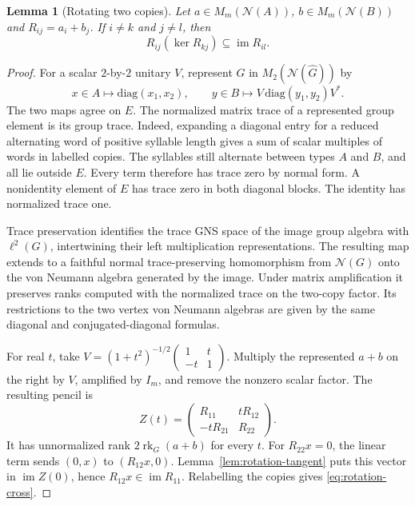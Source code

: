 \documentclass[11pt,a4paper,reqno]{amsart}
\numberwithin{equation}{section}
\newtheorem{lemma}[theorem]{Lemma}
\theoremstyle{remark}
\newcommand{\N}{\mathcal N}
\newcommand{\rk}{\operatorname{rk}}
\newcommand{\im}{\operatorname{im}}
\begin{document}
\begin{lemma}[Rotating two copies]\label{lem:rotation-cross}
Let \(a\in M_m(\N(A))\), \(b\in M_m(\N(B))\) and \(R_{ij}=a_i+b_j\). If \(i\ne k\) and \(j\ne l\), then
\begin{equation}\label{eq:rotation-cross}
                 R_{ij}(\ker R_{kj})\subseteq\im R_{il}.
\end{equation}
\end{lemma}
\begin{proof}
For a scalar \(2\)-by-\(2\) unitary \(V\), represent \(G\) in \(M_2(\N(\widehat G))\) by
\[
 x\in A\longmapsto \mathrm{diag}(x_1,x_2),\qquad
 y\in B\longmapsto V\,\mathrm{diag}(y_1,y_2)V^*.
\]
The two maps agree on \(E\). The normalized matrix trace of a represented group element is its group trace. Indeed, expanding a diagonal entry for a reduced alternating word of positive syllable length gives a sum of scalar multiples of words in labelled copies. The syllables still alternate between types \(A\) and \(B\), and all lie outside \(E\). Every term therefore has trace zero by normal form. A nonidentity element of \(E\) has trace zero in both diagonal blocks. The identity has normalized trace one.

Trace preservation identifies the trace GNS space of the image group algebra with \(\ell^2(G)\), intertwining their left multiplication representations. The resulting map extends to a faithful normal trace-preserving homomorphism from \(\N(G)\) onto the von Neumann algebra generated by the image. Under matrix amplification it preserves ranks computed with the normalized trace on the two-copy factor. Its restrictions to the two vertex von Neumann algebras are given by the same diagonal and conjugated-diagonal formulas.

For real \(t\), take \(V=(1+t^2)^{-1/2}\left(\begin{smallmatrix}1&t\\-t&1\end{smallmatrix}\right)\). Multiply the represented \(a+b\) on the right by \(V\), amplified by \(I_m\), and remove the nonzero scalar factor. The resulting pencil is
\[
     Z(t)=\begin{pmatrix}R_{11}&tR_{12}\\-tR_{21}&R_{22}\end{pmatrix}.
\]
It has unnormalized rank \(2\rk_G(a+b)\) for every \(t\). For \(R_{22}x=0\), the linear term sends \((0,x)\) to \((R_{12}x,0)\). Lemma~\ref{lem:rotation-tangent} puts this vector in \(\im Z(0)\), hence \(R_{12}x\in\im R_{11}\). Relabelling the copies gives \eqref{eq:rotation-cross}.
\end{proof}
\end{document}
